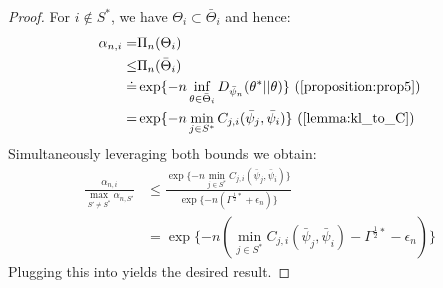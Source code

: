 \begin{proof}
  For $i \notin S^*$, we have $\Theta_i \subset \bar{\Theta}_i$ and hence:
  \begin{align}
    \alpha_{n,i} =& \Pi_n(\Theta_i) \\
    \leq& \Pi_n(\bar{\Theta}_i) \\
    \deq& \exp\{-n \inf_{\theta \in \bar{\Theta}_i}
        D_{\bar{\psi}_n}(\theta^*||\theta)\} \text{
        (\Cref{proposition:prop5})}\\
    =& \exp\{-n \min_{j \in S^*} C_{j, i}(\bar{\psi}_j, \bar{\psi}_i)\} \text{
        (\Cref{lemma:kl_to_C}) } \label{eq: only_i}
  \end{align}
  Simultaneously leveraging both bounds we obtain:
  \begin{align}
    \frac{\alpha_{n, i}}{\max_{S' \neq S^*} \alpha_{n, S'}} &\leq \frac{\exp\{-
        n \min_{j \in S^*} C_{j, i}(\bar{\psi}_j, \bar{\psi}_i)\}}{ \exp\{-n
        (\Gamma^{\frac{1}{2}*} + \epsilon_n)\}} \\
    &= \exp\{-n( \min_{j \in S^*} C_{j, i}(\bar{\psi}_j, \bar{\psi}_i) -
        \Gamma^{\frac{1}{2}*} - \epsilon_n) \}
  \end{align}
  Plugging this into  yields the desired
  result.
\end{proof}

